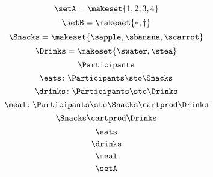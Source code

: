 {\begin{forslides}
    \begin{equation}
        \label{eq:prod-slides-1}
        \setA = \makeset{1, 2, 3, 4}
    \end{equation}
    \begin{equation}
        \label{eq:prod-slides-2}
        \setB = \makeset{ \ast, \dagger }
    \end{equation}
    \begin{equation}
        \label{eq:prod-slides-3}
        \Snacks=\makeset{\sapple,\sbanana,\scarrot}
    \end{equation}
    \begin{equation}
        \label{eq:prod-slides-4}
        \Drinks=\makeset{\swater,\stea}
    \end{equation}
    \begin{equation}
        \label{eq:prod-slides-5}
        \Participants
    \end{equation}
    \begin{equation}
        \label{eq:prod-slides-6}
        \eats \colon \Participants \sto \Snacks
    \end{equation}
    \begin{equation}
        \label{eq:prod-slides-7}
        \drinks \colon  \Participants \sto \Drinks
    \end{equation}
    \begin{equation}
        \label{eq:prod-slides-8}
        \meal \colon \Participants\sto \Snacks \cartprod \Drinks
    \end{equation}
    \begin{equation}
        \label{eq:prod-slides-9}
        \Snacks \cartprod \Drinks
    \end{equation}
    \begin{equation}
        \label{eq:prod-slides-10}
        \eats
    \end{equation}
    \begin{equation}
        \label{eq:prod-slides-11}
        \drinks
    \end{equation}
    \begin{equation}
        \label{eq:prod-slides-12}
        \meal
    \end{equation}
    \begin{equation}
        \label{eq:prod-slides-13}
        \setA
    \end{equation}
    \begin{equation}
        \label{eq:prod-slides-14}

\end{equation}
\end{forslides}}
